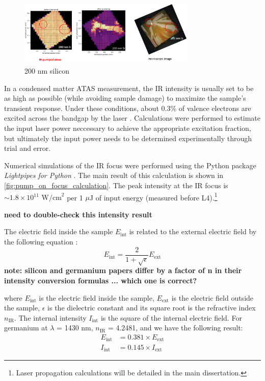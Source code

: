 \begin{figure}
	\centering
	\includegraphics[width=0.75\textwidth]{figures/chap3/Si_damage.png}
	\caption{200 nm silicon}
	\label{fig:Si_damage}
\end{figure}

In a condensed matter ATAS measurement, the IR intensity is usually set to be as high as possible (while avoiding sample damage) to maximize the sample's transient response. Under these conditions, about 0.3\% of valence electrons are excited across the bandgap by the laser \cite{zurchDirectSimultaneousObservation2017, schultzeAttosecondBandgapDynamics2014,cushingDifferentiatingPhotoexcitedCarrier2019}. Calculations were performed to estimate the input laser power neccessary to achieve the appropriate excitation fraction, but ultimately the input power needs to be determined experimentally through trial and error.

Numerical simulations of the IR focus were performed using the Python package \textit{Lightpipes for Python} \cite{vdovinLightPipesPython}. The main result of this calculation is shown in \cref{fig:pump_on_focus_calculation}. The peak intensity at the IR focus is $\sim 1.8 \times 10^{11} \text{ W/cm}^2$  per 1 $\mu$J of input energy (measured before L4).\footnote{Laser propagation calculations will be detailed in the main dissertation.} 

\textbf{need to double-check this intensity result}

The electric field inside the sample $E_{\text{int}}$ is related to the external electric field by the following equation \cite{schultzeAttosecondBandgapDynamics2014}:
\begin{equation}
E_{\text{int}} = \frac{2}{1+\sqrt{\epsilon}} E_{\text{ext}}
\label{eqn:internal_external_Efield}
\end{equation}
\textbf{note: silicon and germanium papers differ by a factor of n in their intensity conversion formulas ... which one is correct?}

where $E_{\text{int}}$ is the electric field inside the sample, $E_{\text{ext}}$ is the electric field outside the sample, $\epsilon$ is the dielectric constant and its square root is the refractive index $n_{\text{IR}}$. The internal intensity $I_{\text{int}}$ is the square of the internal electric field. For germanium at $\lambda$ = 1430 nm, $n_{\text{IR}}$ = 4.2481, and we have the following result:
\begin{equation}
\begin{aligned}
E_{\text{int}} &= 0.381 \times E_{\text{ext}} \\
I_{\text{int}} &= 0.145 \times I_{\text{ext}}
\end{aligned}
\end{equation}

